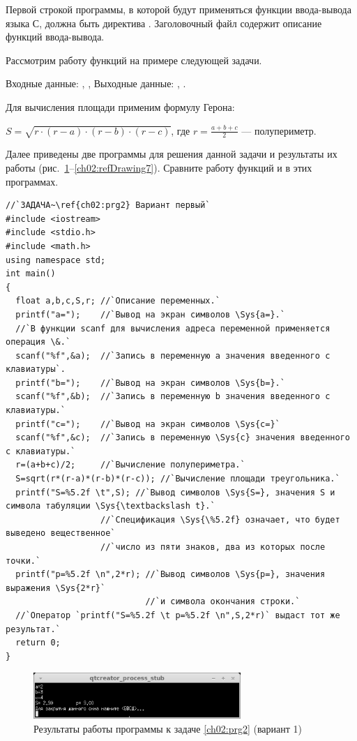 Первой строкой программы, в которой будут применяться функции ввода-вывода языка С, должна быть директива
. Заголовочный файл  содержит
описание функций ввода-вывода. 

Рассмотрим работу функций на примере следующей задачи.


Входные данные: , ,  Выходные данные:
, . 

Для вычисления площади применим формулу Герона:

$S=\sqrt{r\cdot (r-a)\cdot (r-b)\cdot (r-c)}$, где $r=\frac{a+b+c}{2}$ --- полупериметр.

Далее приведены две программы для решения данной задачи и результаты их работы 
(рис.~\ref{ch02:refDrawing6}--\ref{ch02:refDrawing7}).
Сравните работу функций  и  в этих программах.
\begin{lstlisting}
//`ЗАДАЧА~\ref{ch02:prg2} Вариант первый`
#include <iostream>
#include <stdio.h>
#include <math.h>
using namespace std;
int main()
{
  float a,b,c,S,r; //`Описание переменных.`
  printf("a=");	   //`Вывод на экран символов \Sys{a=}.`
  //`В функции scanf для вычисления адреса переменной применяется операция \&.`
  scanf("%f",&a);  //`Запись в переменную а значения введенного с клавиатуры`.
  printf("b=");    //`Вывод на экран символов \Sys{b=}.`
  scanf("%f",&b);  //`Запись в переменную b значения введенного с клавиатуры.`
  printf("c=");    //`Вывод на экран символов \Sys{c=}`
  scanf("%f",&c);  //`Запись в переменную \Sys{c} значения введенного с клавиатуры.`
  r=(a+b+c)/2;     //`Вычисление полупериметра.`
  S=sqrt(r*(r-a)*(r-b)*(r-c)); //`Вычисление площади треугольника.`
  printf("S=%5.2f \t",S); //`Вывод символов \Sys{S=}, значения S и символа табуляции \Sys{\textbackslash t}.`
                   //`Спецификация \Sys{\%5.2f} означает, что будет выведено вещественное` 
                   //`число из пяти знаков, два из которых после точки.`
  printf("p=%5.2f \n",2*r); //`Вывод символов \Sys{p=}, значения выражения \Sys{2*r}` 
                            //`и символа окончания строки.`
  //`Оператор `printf("S=%5.2f \t p=%5.2f \n",S,2*r)` выдаст тот же результат.`
  return 0;
}
\end{lstlisting}

\begin{figure}[htb]
\begin{center}
\includegraphics[width=0.7\textwidth]{img/ris_2_7}
\caption{Результаты работы программы к задаче \ref{ch02:prg2} (вариант 1)}
\label{ch02:refDrawing6}
\end{center}
\end{figure}

